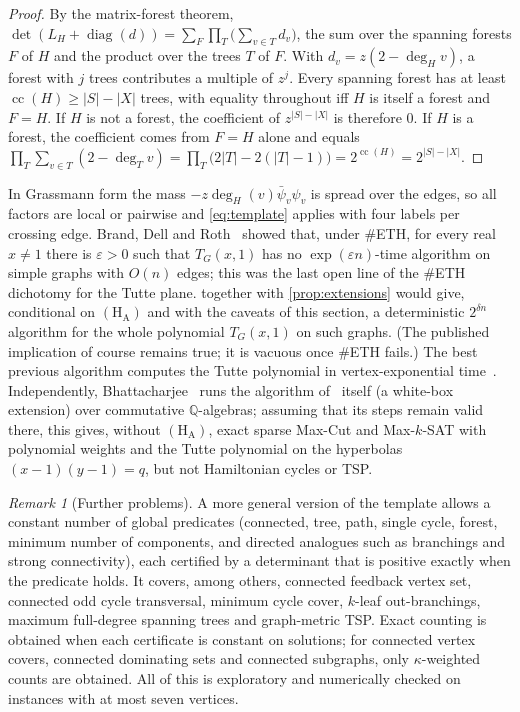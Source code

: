 \documentclass[11pt]{amsart}
\theoremstyle{plain}
\theoremstyle{definition}
\theoremstyle{remark}
\newtheorem{remark}[theorem]{Remark}
\numberwithin{equation}{section}
\newcommand{\bpsi}{\bar\psi}
\newcommand{\Q}{\mathbb{Q}}
\newcommand{\cc}{\operatorname{cc}}
\begin{document}
\begin{proof}
By the matrix-forest theorem, $\det(L_H+\operatorname{diag}(d))=\sum_{F}\prod_{T}\bigl(\sum_{v\in
T}d_v\bigr)$, the sum over the spanning forests $F$ of $H$ and the product over the trees $T$ of
$F$. With $d_v=z(2-\deg_Hv)$, a forest with $j$ trees contributes a multiple of $z^j$. Every
spanning forest has at least $\cc(H)\ge|S|-|X|$ trees, with equality throughout iff $H$ is itself a
forest and $F=H$. If $H$ is not a forest, the coefficient of $z^{|S|-|X|}$ is therefore $0$. If $H$
is a forest, the coefficient comes from $F=H$ alone and equals $\prod_T\sum_{v\in T}(2-\deg_Tv)=
\prod_T\bigl(2|T|-2(|T|-1)\bigr)=2^{\cc(H)}=2^{|S|-|X|}$.
\end{proof}

In Grassmann form the mass $-z\deg_H(v)\bpsi_v\psi_v$ is spread over the edges, so all factors are
local or pairwise and \eqref{eq:template} applies with four labels per crossing edge. Brand, Dell
and Roth~\cite{BrandDellRoth19} showed that, under $\#$ETH, for every real $x\ne1$ there is
$\varepsilon>0$ such that $T_G(x,1)$ has no $\exp(\varepsilon n)$-time algorithm on simple graphs
with $O(n)$ edges; this was the last open
line of the $\#$ETH dichotomy for the Tutte plane.  together with
\cref{prop:extensions} would give, conditional on $(\mathrm{H}_{\mathrm{A}})$ and with the caveats
of this section, a deterministic $2^{\delta n}$ algorithm for the whole polynomial $T_G(x,1)$ on
such graphs. (The published implication of course remains true; it is vacuous once $\#$ETH fails.)
The best previous algorithm computes the Tutte polynomial in vertex-exponential
time~\cite{BHKK08Tutte}.
Independently, Bhattacharjee~\cite{Bhattacharjee26} runs the algorithm of~\cite{OpenAI26} itself
(a white-box extension) over commutative $\Q$-algebras; assuming that its steps remain valid there,
this gives, without $(\mathrm{H}_{\mathrm{A}})$, exact sparse Max-Cut and Max-$k$-SAT with
polynomial weights and the Tutte polynomial on the hyperbolas $(x-1)(y-1)=q$, but not Hamiltonian
cycles or TSP.

\begin{remark}[Further problems]
A more general version of the template allows a constant number of global predicates (connected,
tree, path, single cycle, forest, minimum number of components, and directed analogues such as
branchings and strong connectivity), each certified by a determinant that is positive exactly when
the predicate holds. It covers, among others, connected feedback vertex set, connected odd cycle
transversal, minimum cycle cover, $k$-leaf out-branchings, maximum full-degree spanning trees and
graph-metric TSP. Exact counting is obtained when each certificate is constant on solutions; for
connected vertex covers, connected dominating sets and connected subgraphs, only
$\kappa$-weighted counts are obtained. All of this is exploratory and numerically checked on
instances with at most seven vertices.
\end{remark}
\end{document}
